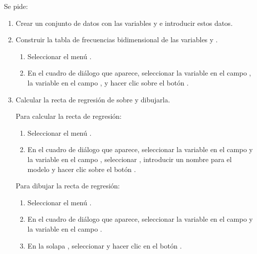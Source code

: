 \begin{enumerate}[leftmargin=*]
Se pide:
\begin{enumerate}
\item  Crear un conjunto de datos con las variables  y  e introducir estos
datos.

\item Construir la tabla de frecuencias bidimensional de las variables  y . 
\begin{indicacion}
\begin{enumerate}
\item Seleccionar el menú .
\item En el cuadro de diálogo que aparece, seleccionar la variable  en el campo , la variable  en el campo , y hacer clic
sobre el botón . 
\end{enumerate}
\end{indicacion}

\item  Calcular la recta de regresión de  sobre  y dibujarla.
\begin{indicacion}
Para calcular la recta de regresión:
\begin{enumerate}
\item Seleccionar el menú .
\item En el cuadro de diálogo que aparece, seleccionar la variable  en el campo  y la variable  en el campo , seleccionar
, introducir un nombre para el modelo y hacer clic sobre el botón .
\end{enumerate}
Para dibujar la recta de regresión:
\begin{enumerate}
\item Seleccionar el menú .
\item En el cuadro de diálogo que aparece, seleccionar la variable  en el campo  y
la variable  en el campo .
\item En la solapa , seleccionar  y hacer clic en el botón
.
\end{enumerate}
\end{indicacion}


\end{enumerate}
\end{enumerate}
